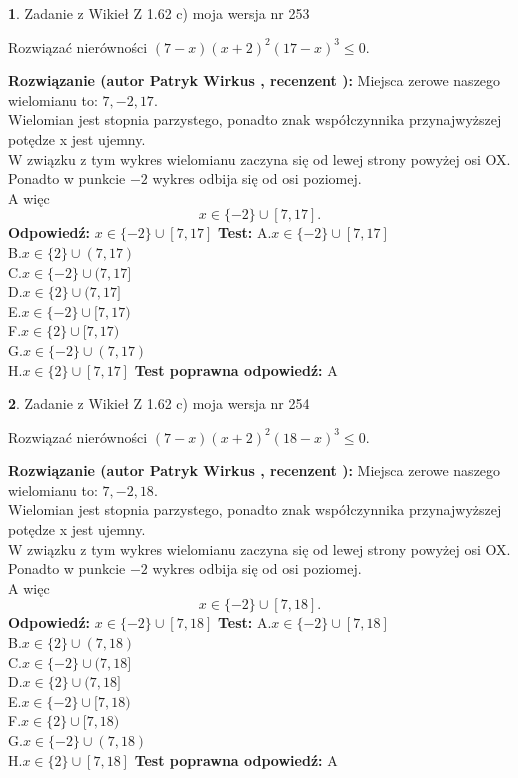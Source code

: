 \documentclass[12pt, a4paper]{article}
\theoremstyle{definition} %
\newtheorem{zad}{}
\newcommand{\zadStart}[1]{\begin{zad}#1\newline}
\newcommand{\zadStop}{\end{zad}}
\newcommand{\rozwStart}[2]{\noindent \textbf{Rozwiązanie (autor #1 , recenzent #2): }\newline}
\newcommand{\rozwStop}{\newline}
\newcommand{\odpStart}{\noindent \textbf{Odpowiedź:}\newline}
\newcommand{\odpStop}{\newline}
\newcommand{\testStart}{\noindent \textbf{Test:}\newline}
\newcommand{\testStop}{\newline}
\newcommand{\kluczStart}{\noindent \textbf{Test poprawna odpowiedź:}\newline}
\newcommand{\kluczStop}{\newline}
\begin{document}
\zadStart{Zadanie z Wikieł Z 1.62 c) moja wersja nr 253}

Rozwiązać nierówności $(7-x)(x+2)^{2}(17-x)^{3}\le0$.
\zadStop
\rozwStart{Patryk Wirkus}{}
Miejsca zerowe naszego wielomianu to: $7, -2, 17$.\\
Wielomian jest stopnia parzystego, ponadto znak współczynnika przy\linebreak najwyższej potędze x jest ujemny.\\ W związku z tym wykres wielomianu zaczyna się od lewej strony powyżej osi OX.\\
Ponadto w punkcie $-2$ wykres odbija się od osi poziomej.\\
A więc $$x \in \{-2\} \cup [7,17].$$
\rozwStop
\odpStart
$x \in \{-2\} \cup [7,17]$
\odpStop
\testStart
A.$x \in \{-2\} \cup [7,17]$\\
B.$x \in \{2\} \cup (7,17)$\\
C.$x \in \{-2\} \cup (7,17]$\\
D.$x \in \{2\} \cup (7,17]$\\
E.$x \in \{-2\} \cup [7,17)$\\
F.$x \in \{2\} \cup [7,17)$\\
G.$x \in \{-2\} \cup (7,17)$\\
H.$x \in \{2\} \cup [7,17]$
\testStop
\kluczStart
A
\kluczStop



\zadStart{Zadanie z Wikieł Z 1.62 c) moja wersja nr 254}

Rozwiązać nierówności $(7-x)(x+2)^{2}(18-x)^{3}\le0$.
\zadStop
\rozwStart{Patryk Wirkus}{}
Miejsca zerowe naszego wielomianu to: $7, -2, 18$.\\
Wielomian jest stopnia parzystego, ponadto znak współczynnika przy\linebreak najwyższej potędze x jest ujemny.\\ W związku z tym wykres wielomianu zaczyna się od lewej strony powyżej osi OX.\\
Ponadto w punkcie $-2$ wykres odbija się od osi poziomej.\\
A więc $$x \in \{-2\} \cup [7,18].$$
\rozwStop
\odpStart
$x \in \{-2\} \cup [7,18]$
\odpStop
\testStart
A.$x \in \{-2\} \cup [7,18]$\\
B.$x \in \{2\} \cup (7,18)$\\
C.$x \in \{-2\} \cup (7,18]$\\
D.$x \in \{2\} \cup (7,18]$\\
E.$x \in \{-2\} \cup [7,18)$\\
F.$x \in \{2\} \cup [7,18)$\\
G.$x \in \{-2\} \cup (7,18)$\\
H.$x \in \{2\} \cup [7,18]$
\testStop
\kluczStart
A
\kluczStop
\end{document}
